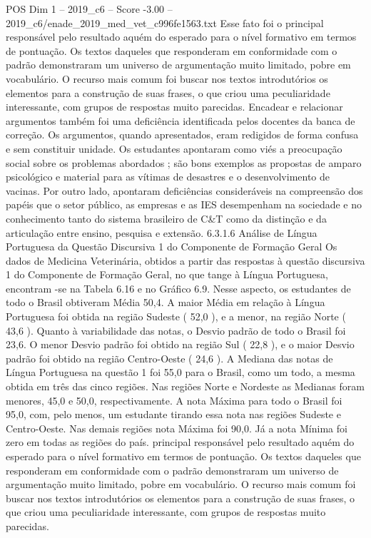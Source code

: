 \begin{textsample}{POS Dim 1 – 2019\_c6 – Score -3.00 – 2019\_c6/enade\_2019\_med\_vet\_c996fe1563.txt}
Esse fato foi o principal responsável pelo resultado aquém do esperado para o nível formativo em termos de pontuação.
Os textos daqueles que responderam em conformidade com o padrão demonstraram um universo de argumentação muito limitado, pobre em vocabulário.
O recurso mais comum foi buscar nos textos introdutórios os elementos para a construção de suas frases, o que criou uma peculiaridade interessante, com grupos de respostas muito parecidas.
Encadear e relacionar argumentos também foi uma deficiência identificada pelos docentes da banca de correção.
Os argumentos, quando apresentados, eram redigidos de forma confusa e sem constituir unidade.
Os estudantes apontaram como viés a preocupação social sobre os problemas abordados ; são bons exemplos as propostas de amparo psicológico e material para as vítimas de desastres e o desenvolvimento de vacinas.
Por outro lado, apontaram deficiências consideráveis na compreensão dos papéis que o setor público, as empresas e as IES desempenham na sociedade e no conhecimento tanto do sistema brasileiro de C\&T como da distinção e da articulação entre ensino, pesquisa e extensão. 6.3.1.6 Análise de Língua Portuguesa da Questão Discursiva 1 do Componente de Formação Geral Os dados de Medicina Veterinária, obtidos a partir das respostas à questão discursiva 1 do Componente de Formação Geral, no que tange à Língua Portuguesa, encontram -se na Tabela 6.16 e no Gráfico 6.9.
Nesse aspecto, os estudantes de todo o Brasil obtiveram Média 50,4.
A maior Média em relação à Língua Portuguesa foi obtida na região Sudeste ( 52,0 ), e a menor, na região Norte ( 43,6 ).
Quanto à variabilidade das notas, o Desvio padrão de todo o Brasil foi 23,6.
O menor Desvio padrão foi obtido na região Sul ( 22,8 ), e o maior Desvio padrão foi obtido na região Centro-Oeste ( 24,6 ).
A Mediana das notas de Língua Portuguesa na questão 1 foi 55,0 para o Brasil, como um todo, a mesma obtida em três das cinco regiões.
Nas regiões Norte e Nordeste as Medianas foram menores, 45,0 e 50,0, respectivamente.
A nota Máxima para todo o Brasil foi 95,0, com, pelo menos, um estudante tirando essa nota nas regiões Sudeste e Centro-Oeste.
Nas demais regiões nota Máxima foi 90,0.
Já a nota Mínima foi zero em todas as regiões do país. principal responsável pelo resultado aquém do esperado para o nível formativo em termos de pontuação.
Os textos daqueles que responderam em conformidade com o padrão demonstraram um universo de argumentação muito limitado, pobre em vocabulário.
O recurso mais comum foi buscar nos textos introdutórios os elementos para a construção de suas frases, o que criou uma peculiaridade interessante, com grupos de respostas muito parecidas.

\end{textsample}
